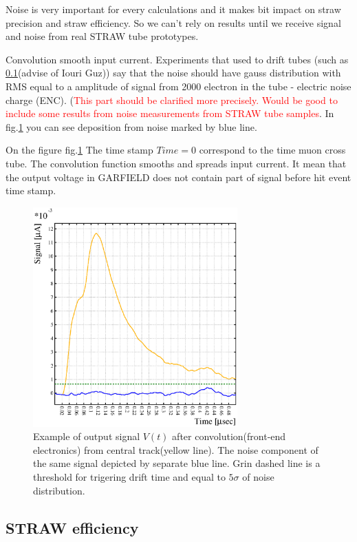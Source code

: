 \documentclass[]{article}
\begin{document}
	Noise is very important for every calculations and it makes bit impact on straw precision and straw efficiency. So we can't rely on results until we receive signal and noise  from real STRAW tube prototypes.
		
	Convolution smooth input current. Experiments that used to drift tubes (such as \ref{}(advise of Iouri Guz)) say that the noise should have gauss distribution with RMS equal to a amplitude of signal from 2000 electron in the tube - electric noise charge (ENC). (\textcolor{red}{This part should be clarified more precisely. Would be good to include some results from noise measurements from STRAW tube samples}. In fig.\ref{fig:signal_example} you can see deposition from noise marked by blue line.

On the figure fig.\ref{fig:signal_example} The time stamp $Time=0$ correspond to the time muon cross tube. The convolution function smooths and spreads input current. It mean that the output voltage in GARFIELD does not contain part of signal before hit event time stamp. 

	\begin{figure}[h!]
	\centering
	\includegraphics[width=0.7\textwidth]{signal_noise_threshold.eps}
	\caption{ Example of output signal $V(t)$ after convolution(front-end electronics) from central track(yellow line). The noise component of the same signal depicted by separate blue line. Grin dashed line is a threshold for trigering drift time and equal to $5\sigma$ of noise distribution.}
	\label{fig:signal_example}
	\end{figure}
	
	\subsection{ STRAW efficiency}
	
\end{document}
